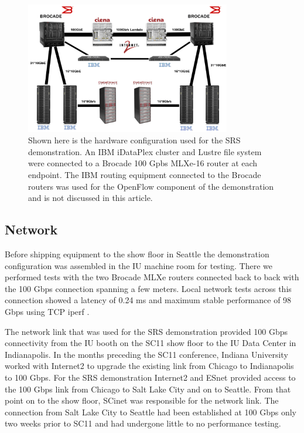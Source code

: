 \documentclass[]{sigplan-proc}
\begin{document}
\begin{figure}[t]
\begin{center}
\includegraphics[width=0.80\textwidth]{figures/hardware.png}
\caption{Shown here is the hardware configuration used for the SRS demonstration. An IBM iDataPlex cluster and
  Lustre file system were connected to a Brocade 100 Gpbs MLXe-16 router at each endpoint. The IBM routing
  equipment connected to the Brocade routers was used for the OpenFlow component of the demonstration and is
  not discussed in this article. }
\label{fig:hardwaresetup}
\end{center}
\end{figure}

\subsection{Network}\label{sec:network}

Before shipping equipment to the show floor in Seattle the demonstration configuration was assembled in the IU
machine room for testing.  There we performed tests with the two Brocade MLXe routers connected back to back
with the 100 Gbps connection spanning a few meters.  Local network tests across this connection showed a
latency of 0.24 ms and maximum stable performance of 98 Gbps using TCP iperf \cite{iperf2012}.

The network link that was used for the SRS demonstration provided 100 Gbps connectivity from the IU booth on
the SC11 show floor to the IU Data Center in Indianapolis. In the months preceding the SC11 conference,
Indiana University worked with Internet2 to upgrade the existing link from Chicago to Indianapolis to 100
Gbps. For the SRS demonstration Internet2 and ESnet provided access to the 100 Gbps link from Chicago to Salt
Lake City and on to Seattle. From that point on to the show floor, SCinet was responsible for the network
link. The connection from Salt Lake City to Seattle had been established at 100 Gbps only two weeks prior to
SC11 and had undergone little to no performance testing.
\end{document}
